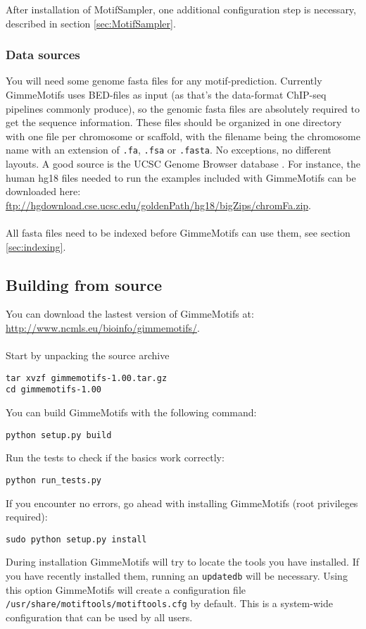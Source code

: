 \documentclass[10pt]{article}
\begin{document}
After installation of MotifSampler, one additional configuration step is necessary, described in section \ref{sec:MotifSampler}.

\subsubsection{Data sources}
You will need some genome fasta files for any motif-prediction. Currently GimmeMotifs uses BED-files as input (as that's the data-format ChIP-seq pipelines commonly produce), so the genomic fasta files are absolutely required to get the sequence information. These files should be organized in one directory with one file per chromosome or scaffold, with the filename being the chromosome name with an extension of \texttt{.fa}, \texttt{.fsa} or \texttt{.fasta}. No exceptions, no different layouts. A good source is the UCSC Genome Browser database \cite{rhead_ucsc_2010}. For instance, the human hg18 files needed to run the examples included with GimmeMotifs can be downloaded here:\\
\url{ftp://hgdownload.cse.ucsc.edu/goldenPath/hg18/bigZips/chromFa.zip}.\\
\\
All fasta files need to be indexed before GimmeMotifs can use them, see section \ref{sec:indexing}.

\subsection{Building from source}
You can download the lastest version of GimmeMotifs at:\\
\url{http://www.ncmls.eu/bioinfo/gimmemotifs/}. \\
\\
Start by unpacking the source archive
\begin{verbatim}
tar xvzf gimmemotifs-1.00.tar.gz
cd gimmemotifs-1.00
\end{verbatim}
You can build GimmeMotifs with the following command:
\begin{verbatim}
python setup.py build
\end{verbatim}
Run the tests to check if the basics work correctly:
\begin{verbatim}
python run_tests.py
\end{verbatim}
If you encounter no errors, go ahead with installing GimmeMotifs (root privileges required):
\begin{verbatim}
sudo python setup.py install
\end{verbatim}
During installation GimmeMotifs will try to locate the tools you have installed. If you have recently installed them, running an \texttt{updatedb} will be necessary. Using this option GimmeMotifs will create a configuration file \texttt{/usr/share/motiftools/motiftools.cfg} by default. This is a system-wide configuration that can be used by all users. 
\end{document}

